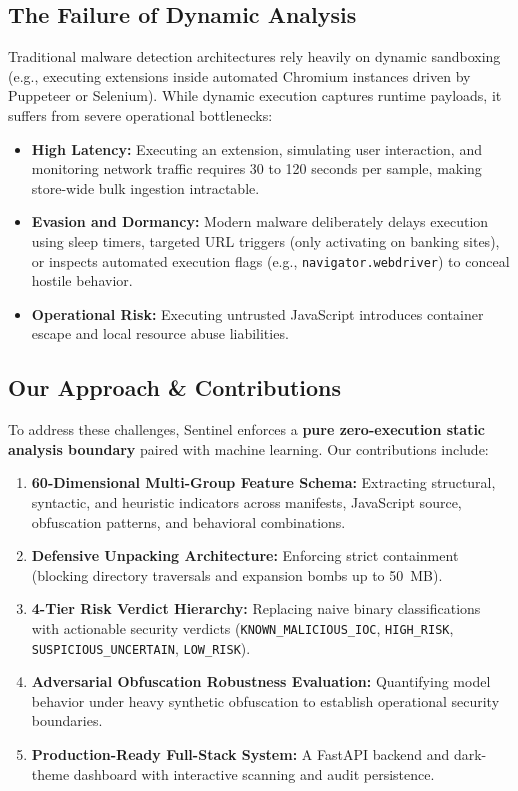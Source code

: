 \documentclass[conference]{IEEEtran}
\begin{document}
\subsection{The Failure of Dynamic Analysis}
Traditional malware detection architectures rely heavily on dynamic sandboxing (e.g., executing extensions inside automated Chromium instances driven by Puppeteer or Selenium). While dynamic execution captures runtime payloads, it suffers from severe operational bottlenecks:
\begin{itemize}
    \item \textbf{High Latency:} Executing an extension, simulating user interaction, and monitoring network traffic requires 30 to 120 seconds per sample, making store-wide bulk ingestion intractable.
    \item \textbf{Evasion and Dormancy:} Modern malware deliberately delays execution using sleep timers, targeted URL triggers (only activating on banking sites), or inspects automated execution flags (e.g., \texttt{navigator.webdriver}) to conceal hostile behavior.
    \item \textbf{Operational Risk:} Executing untrusted JavaScript introduces container escape and local resource abuse liabilities.
\end{itemize}

\subsection{Our Approach \& Contributions}
To address these challenges, Sentinel enforces a \textbf{pure zero-execution static analysis boundary} paired with machine learning. Our contributions include:
\begin{enumerate}
    \item \textbf{60-Dimensional Multi-Group Feature Schema:} Extracting structural, syntactic, and heuristic indicators across manifests, JavaScript source, obfuscation patterns, and behavioral combinations.
    \item \textbf{Defensive Unpacking Architecture:} Enforcing strict containment (blocking directory traversals and expansion bombs up to 50~MB).
    \item \textbf{4-Tier Risk Verdict Hierarchy:} Replacing naive binary classifications with actionable security verdicts (\texttt{KNOWN\_MALICIOUS\_IOC}, \texttt{HIGH\_RISK}, \texttt{SUSPICIOUS\_UNCERTAIN}, \texttt{LOW\_RISK}).
    \item \textbf{Adversarial Obfuscation Robustness Evaluation:} Quantifying model behavior under heavy synthetic obfuscation to establish operational security boundaries.
    \item \textbf{Production-Ready Full-Stack System:} A FastAPI backend and dark-theme dashboard with interactive scanning and audit persistence.
\end{enumerate}
\end{document}
